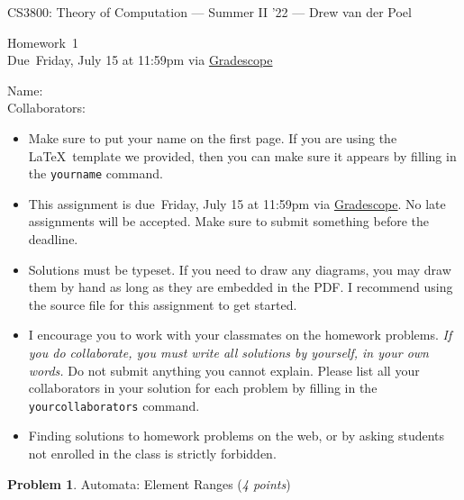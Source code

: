 \documentclass[11pt]{article}
\newcommand{\yourname}{}
\newcommand{\yourcollaborators}{}
\theoremstyle{definition}
\newcommand{\instructor}{Drew van der Poel}
\newcommand{\hwnum}{1}
\newcommand{\hwdue}{Friday, July 15 at 11:59pm via \href{https://www.gradescope.com/courses/406943}{Gradescope}}
\theoremstyle{theorem}
\newtheorem{prob}{Problem}
\begin{document}
{\Large 
\begin{center}{CS3800: Theory of Computation} --- Summer II '22 --- \instructor \end{center}}
{\large
\vspace{10pt}
\noindent Homework~\hwnum \vspace{2pt}\\
Due~\hwdue}

\bigskip
{\large
\noindent Name: \yourname \vspace{2pt}\\ Collaborators: \yourcollaborators}

\vspace{15pt}
\begin{itemize}

\item Make sure to put your name on the first page.  If you are using the \LaTeX~template we provided, then you can make sure it appears by filling in the \texttt{yourname} command.

\item This assignment is due~\hwdue.  No late assignments will be accepted.  Make sure to submit something before the deadline.

\item Solutions must be typeset.  If you need to draw any diagrams, you may draw them by hand as long as they are embedded in the PDF.  I recommend using the source file for this assignment to get started.

\item I encourage you to work with your classmates on the homework problems. \emph{If you do collaborate, you must write all solutions by yourself, in your own words.}  Do not submit anything you cannot explain.  Please list all your collaborators in your solution for each problem by filling in the \texttt{yourcollaborators} command.

\item Finding solutions to homework problems on the web, or by asking students not enrolled in the class is strictly forbidden.

\end{itemize}



\newpage

\begin{prob} Automata: Element Ranges (\emph{4 points})\end{prob}
\end{document}
